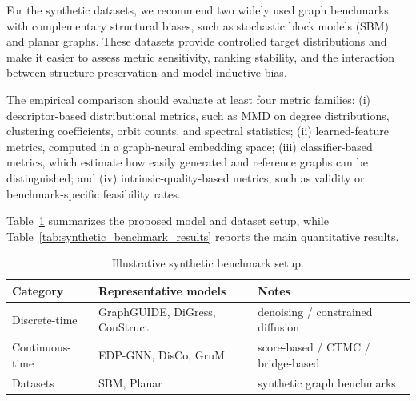 \documentclass{article}
\begin{document}
For the synthetic datasets, we recommend two widely used graph benchmarks with complementary structural biases, such as stochastic block models (SBM) and planar graphs. These datasets provide controlled target distributions and make it easier to assess metric sensitivity, ranking stability, and the interaction between structure preservation and model inductive bias.

The empirical comparison should evaluate at least four metric families:
(i) descriptor-based distributional metrics, such as MMD on degree distributions, clustering coefficients, orbit counts, and spectral statistics;
(ii) learned-feature metrics, computed in a graph-neural embedding space;
(iii) classifier-based metrics, which estimate how easily generated and reference graphs can be distinguished; and
(iv) intrinsic-quality-based metrics, such as validity or benchmark-specific feasibility rates.

Table~\ref{tab:synthetic_benchmark_setup} summarizes the proposed model and dataset setup, while Table~\ref{tab:synthetic_benchmark_results} reports the main quantitative results.

\begin{table}[http]
\centering
\caption{Illustrative synthetic benchmark setup.}
\label{tab:synthetic_benchmark_setup}
\small
\begin{tabular}{l l l}
\toprule
Category & Representative models & Notes \\
\midrule
Discrete-time & GraphGUIDE, DiGress, ConStruct & denoising / constrained diffusion \\
Continuous-time & EDP-GNN, DisCo, GruM & score-based / CTMC / bridge-based \\
Datasets & SBM, Planar & synthetic graph benchmarks \\
\bottomrule
\end{tabular}
\end{table}
\end{document}

